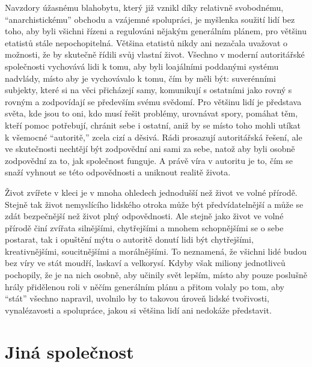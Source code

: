 \documentclass{book}
\begin{document}
Navzdory úžasnému blahobytu, který již vznikl díky relativně svobodnému, \enquote{anarchistickému} obchodu a vzájemné spolupráci, je myšlenka soužití lidí bez toho, aby byli všichni řízeni a regulováni nějakým generálním plánem, pro většinu etatistů stále nepochopitelná. Většina etatistů nikdy ani nezačala uvažovat o možnosti, že by skutečně řídili svůj vlastní život. Všechno v moderní autoritářské společnosti vychovává lidi k tomu, aby byli loajálními poddanými systému nadvlády, místo aby je vychovávalo k tomu, čím by měli být: suverénními subjekty, které si na věci přicházejí samy, komunikují s ostatními jako rovný s rovným a zodpovídají se především svému svědomí. Pro většinu lidí je představa světa, kde jsou to oni, kdo musí řešit problémy, urovnávat spory, pomáhat těm, kteří pomoc potřebují, chránit sebe i ostatní, aniž by se místo toho mohli utíkat k všemocné \enquote{autoritě,} zcela cizí a děsivá. Rádi prosazují autoritářská řešení, ale ve skutečnosti nechtějí být zodpovědní ani sami za sebe, natož aby byli osobně zodpovědní za to, jak společnost funguje. A právě víra v autoritu je to, čím se snaží vyhnout se této odpovědnosti a uniknout realitě života.

Život zvířete v kleci je v mnoha ohledech jednodušší než život ve volné přírodě. Stejně tak život nemyslícího lidského otroka může být předvídatelnější a může se zdát bezpečnější než život plný odpovědnosti. Ale stejně jako život ve volné přírodě činí zvířata silnějšími, chytřejšími a mnohem schopnějšími se o sebe postarat, tak i opuštění mýtu o autoritě donutí lidi být chytřejšími, kreativnějšími, soucitnějšími a morálnějšími. To neznamená, že všichni lidé budou bez víry ve stát moudří, laskaví a velkorysí. Kdyby však miliony jednotlivců pochopily, že je na nich osobně, aby učinily svět lepším, místo aby pouze poslušně hrály přidělenou roli v něčím generálním plánu a přitom volaly po tom, aby \enquote{stát} všechno napravil, uvolnilo by to takovou úroveň lidské tvořivosti, vynalézavosti a spolupráce, jakou si většina lidí ani nedokáže představit.

\section{Jiná společnost}
\end{document}
